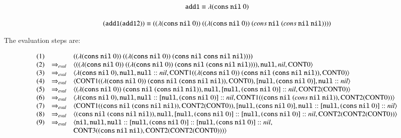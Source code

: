 \documentclass{article}
\begin{document}
\[
\mathtt{add1} \equiv \lambda (\mathtt{cons}~\mathtt{nil}~0)
\]

\[
(\mathtt{add1} (\mathtt{add1} 2)) \equiv 
((\lambda (\mathtt{cons}~\mathtt{nil}~0))
 ~((\lambda (\mathtt{cons}~\mathtt{nil}~0))~(cons~\mathtt{nil}~(cons~\mathtt{nil}~\mathtt{nil}))))
\]

The evaluation steps are:
\newcommand{\estep}{\ensuremath{\Rightarrow_\mathit{eval}}}
\newcommand{\cont}[1]{\ensuremath{\mathrm{CONT{#1}}}}
\newcommand{\br}{\ensuremath{\quad}}

\[
\begin{array}{crl}
  (1) & & ((\lambda (\cons~\nil~0))
  ~((\lambda (\cons~\nil~0))~(\cons~\nil~\cons~\nil~\nil)))) \\

  (2) & \estep & \langle
  ((\lambda (\cons~\nil~0))
  ~((\lambda (\cons~\nil~0))~(\cons~\nil~(\cons~\nil~\nil)))),
  \null,
  \nils,
  \cont{0}
  \rangle \\
  
  (3) & \estep & \langle
  \lambda (\cons~\nil~0),
  \null,
  \null :: \nils,
  \cont{1}((\lambda (\cons~\nil~0))~(\cons~\nil~(\cons~\nil~\nil)),
           \cont{0})
  \rangle \\

  (4) & \estep & \langle 
  \cont{1}((\lambda (\cons~\nil~0))~(\cons~\nil~(\cons~\nil~\nil)),
  \cont{0}),
  [\null, (\cons~\nil~0)],
  \null :: \nils
  \rangle \\

  (5) & \estep & \langle
  (\lambda (\cons~\nil~0))~(\cons~\nil~(\cons~\nil~\nil)),
  \null,
  [\null, (\cons~\nil~0)] :: \nils,
  \cont{2}(\cont{0})
  \rangle \\

  (6) & \estep & \langle
  \lambda (\cons~\nil~0),
  \null,
  \null :: [\null, (\cons~\nil~0)] :: \nils,
  \cont{1}((\cons~\nil~(cons~\nil~\nil)), \cont{2}(\cont{0}))
  \rangle \\

  (7) & \estep & \langle
  \cont{1}((\cons~\nil~(\cons~\nil~\nil)), \cont{2}(\cont{0})),
  [\null, (\cons~\nil~0)],
  \null :: [\null, (\cons~\nil~0)] :: \nils
  \rangle \\

  (8) & \estep & \langle
  (\cons~\nil~(\cons~\nil~\nil)),
  \null,
  [\null, (\cons~\nil~0)] :: [\null, (\cons~\nil~0)] :: \nils,
  \cont{2}(\cont{2}(\cont{0}))
  \rangle \\

  (9) & \estep & \langle
  \nil,
  \null,
  \null :: [\null, (\cons~\nil~0)] :: [\null, (\cons~\nil~0)] :: \nils, \\
  & \br &
  \cont{3}((\cons~\nil~\nil), \cont{2}(\cont{2}(\cont{0})))
  \rangle \\


\end{array}\]
\end{document}
